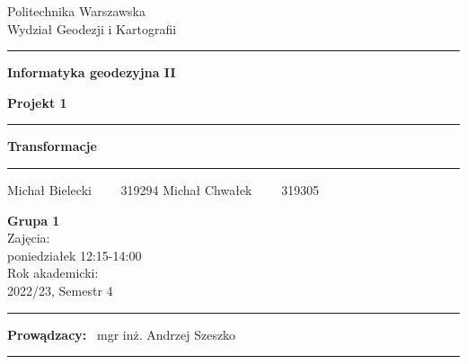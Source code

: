 \documentclass[a4paper,12pt]{article}
\begin{document}
	
	\begin{titlepage}
		
		\begin{center}
			Politechnika Warszawska \\
			Wydział Geodezji i Kartografii
		\end{center}
		
		\hrule
		\vspace*{1cm}
		\begin{center}
			\Large{\textbf{Informatyka geodezyjna II}}
		\end{center}
		
		
		\vspace*{2cm}
		\begin{center}
			\large{\textbf{Projekt 1}} 
		\end{center}
		\vspace{3cm}
		\hrule
		
		\begin{center}
			\Large{\textbf{Transformacje}}
		\end{center}
		\hrule
		
		\vspace*{2cm}
		\begin{center}
			\large{Michał Bielecki \ \ \ \ 319294} 
			\large{Michał Chwałek \ \ \ \ 319305} 
		\end{center}
		
		\vspace*{3cm}
		
		\begin{center}
			\normalsize{\textbf{Grupa 1}}\\
			\small{Zajęcia: \\poniedziałek 12:15-14:00} \\
			\small{Rok akademicki:\\ 2022/23, Semestr 4}
		\end{center}
		
		\vspace*{3cm}
		\hrule
		\begin{center}
			\large{\textbf{Prowądzacy:} \ mgr inż. Andrzej Szeszko}
		\end{center}
		\hrule
		
		
	\end{titlepage}



	
\end{document}
